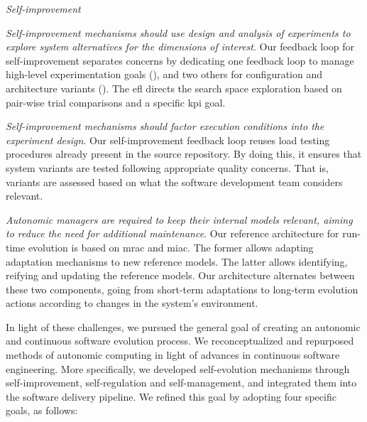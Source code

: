 \textit{Self-improvement}

\begin{description}[leftmargin=4.2em]
	\item[\textsc{Ch}4:] \emph{Self-improvement mechanisms should use design and analysis of experiments to explore system alternatives for the dimensions of interest}. Our feedback loop for self-improvement separates concerns by dedicating one feedback loop to manage high-level experimentation goals (), and two others for configuration and architecture variants (). The \gls{efl} directs the search space exploration based on pair-wise trial comparisons and a specific \gls{kpi} goal.

	\item[\textsc{Ch}5:] \emph{Self-improvement mechanisms should factor execution conditions into the experiment design}. Our self-improvement feedback loop reuses load testing procedures already present in the source repository. By doing this, it ensures that system variants are tested following appropriate quality concerns. That is, variants are assessed based on what the software development team considers relevant.

	\item[\textsc{Ch}6:] \emph{Autonomic managers are required to keep their internal models relevant, aiming to reduce the need for additional maintenance}. Our reference architecture for run-time evolution is based on \gls{mrac} and \gls{miac}. The former allows adapting adaptation mechanisms to new reference models. The latter allows identifying, reifying and updating the reference models. Our architecture alternates between these two components, going from short-term adaptations to long-term evolution actions according to changes in the system's environment.
\end{description}

In light of these challenges, we pursued the general goal of creating an autonomic and continuous software evolution process. We reconceptualized and repurposed methods of autonomic computing in light of advances in continuous software engineering. More specifically, we developed self-evolution mechanisms through self-improvement, self-regulation and self-management, and integrated them into the software delivery pipeline. We refined this goal by adopting four specific goals, as follows:

